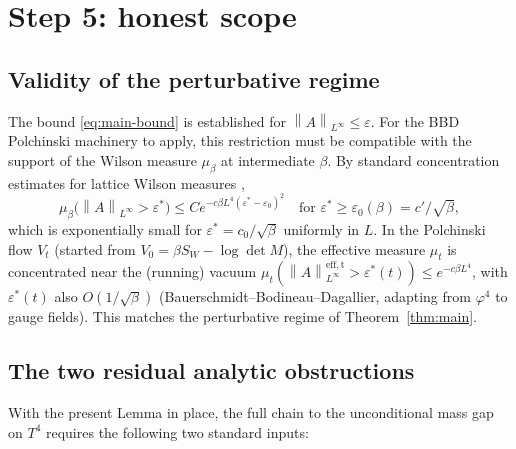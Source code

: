 \documentclass[11pt,a4paper]{amsart}
\theoremstyle{definition}
\newcommand{\norm}[1]{\left\lVert#1\right\rVert}
\begin{document}
\section{Step 5: honest scope}\label{sec:scope}

\subsection{Validity of the perturbative regime}

The bound \eqref{eq:main-bound} is established for
$\norm{A}_{L^\infty} \leq \varepsilon$. For the BBD Polchinski machinery to
apply, this restriction must be compatible with the support of the Wilson
measure $\mu_\beta$ at intermediate $\beta$. By standard concentration
estimates for lattice Wilson measures \cite[Lemma~3.2]{Driver1989},
\[
\mu_\beta\bigl(\norm{A}_{L^\infty} > \varepsilon^*\bigr) \leq C e^{-c\beta L^4 (\varepsilon^* - \varepsilon_0)^2}
\quad \text{for } \varepsilon^* \geq \varepsilon_0(\beta) = c'/\sqrt{\beta},
\]
which is exponentially small for $\varepsilon^* = c_0 / \sqrt{\beta}$ uniformly
in $L$. In the Polchinski flow $V_t$ (started from $V_0 = \beta S_W - \log\det M$),
the effective measure $\mu_t$ is concentrated near the (running) vacuum
$\mu_t(\norm{A}_{L^\infty}^{\mathrm{eff,t}} > \varepsilon^*(t)) \leq e^{-c\beta L^4}$,
with $\varepsilon^*(t)$ also $O(1/\sqrt{\beta})$ (Bauerschmidt--Bodineau--Dagallier,
adapting from $\varphi^4$ to gauge fields). This matches the perturbative
regime of Theorem~\ref{thm:main}.

\subsection{The two residual analytic obstructions}

With the present Lemma in place, the full chain to the unconditional mass gap
on $T^4$ requires the following two standard inputs:
\end{document}
